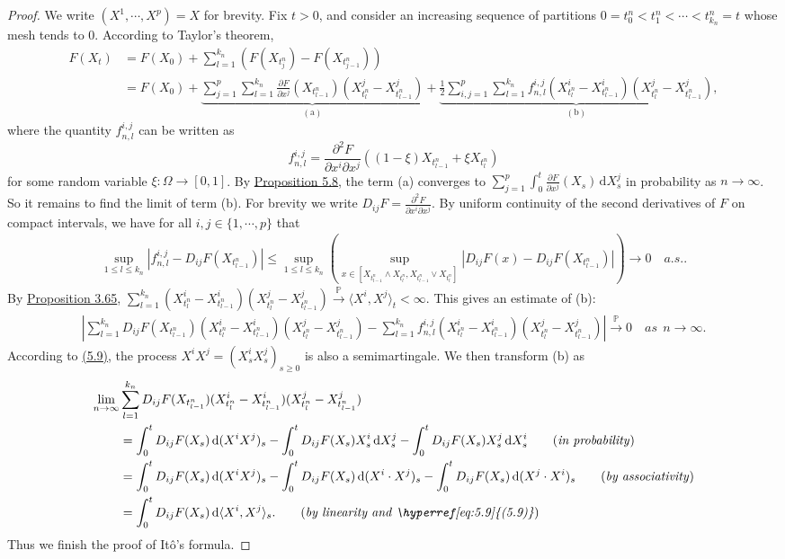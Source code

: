 \documentclass{article}
\numberwithin{equation}{section}
\renewcommand{\P}{\mathbb{P}}
\renewcommand{\d}{\mathrm{d}}
\theoremstyle{plain}
\theoremstyle{definition}
\begin{document}
\begin{proof}
We write $(X^1,\cdots,X^p)=X$ for brevity. Fix $t>0$, and consider an increasing sequence of partitions $0=t_0^n<t_1^n<\cdots<t_{k_n}^n=t$ whose mesh tends to $0$. According to Taylor's theorem,
\begin{align*}
	F(X_t)&=F(X_0)+\sum_{l=1}^{k_n}\left(F(X_{t_j^n})-F(X_{t_{j-1}^n})\right)\\
	&=F(X_0)+\underbrace{\sum_{j=1}^p\sum_{l=1}^{k_n}\frac{\partial F}{\partial x^j}(X_{t_{l-1}^n})(X_{t_l^n}^j-X_{t_{l-1}^n}^j)}_{\mathrm{(a)}} + \underbrace{\frac{1}{2}\sum_{i,j=1}^p\sum_{l=1}^{k_n} f_{n,l}^{i,j}(X_{t_l^n}^i-X_{t_{l-1}^n}^i)(X_{t_l^n}^j-X_{t_{l-1}^n}^j)}_{\mathrm{(b)}},
\end{align*}
where the quantity $f_{n,l}^{i,j}$ can be written as 
$$f_{n,l}^{i,j} = \frac{\partial^2 F}{\partial x^i\partial x^j}((1-\xi)X_{t_{l-1}^n}+\xi X_{t_l^n})$$
for some random variable $\xi:\Omega\to[0,1]$. By \hyperref[prop:5.8]{Proposition 5.8}, the term (a) converges to $\sum_{j=1}^p\int_0^t\frac{\partial F}{\partial x^j}(X_s)\,\d X_s^j$ in probability as $n\to\infty$. So it remains to find the limit of term (b). For brevity we write $D_{ij}F=\frac{\partial^2 F}{\partial x^i\partial x^j}$. By uniform continuity of the second derivatives of $F$ on compact intervals, we have for all $i,j\in\{1,\cdots,p\}$ that
\begin{align*}
	\sup_{1\leq l\leq k_n}\left\vert f_{n,l}^{i,j}-D_{ij}F(X_{t_{l-1}^n})\right\vert\leq\sup_{1\leq l\leq k_n}\left(\sup_{x\in\left[X_{t_{l-1}^n}\wedge X_{t_l^n},X_{t_{l-1}^n}\vee X_{t_l^n}\right]} \left\vert D_{ij}F(x)-D_{ij}F(X_{t_{l-1}^n})\right\vert\right)\to 0\quad a.s..
\end{align*}
By \hyperref[prop:3.65]{Proposition 3.65}, $\sum_{l=1}^{k_n}(X_{t_l^n}^i-X_{t_{l-1}^n}^i)(X_{t_l^n}^j-X_{t_{l-1}^n}^j)\overset{\P}{\to}\langle X^i,X^j\rangle_t < \infty$. This gives an estimate of (b):
\begin{align*}
	\left\vert\sum_{l=1}^{k_n} D_{ij}F(X_{t_{l-1}^n})(X_{t_l^n}^i-X_{t_{l-1}^n}^i)(X_{t_l^n}^j-X_{t_{l-1}^n}^j)-\sum_{l=1}^{k_n} f_{n,l}^{i,j}(X_{t_l^n}^i-X_{t_{l-1}^n}^i)(X_{t_l^n}^j-X_{t_{l-1}^n}^j)\right\vert\overset{\P}{\to} 0\quad \textit{as}\ \ n\to\infty.
\end{align*}
According to \hyperref[eq:5.9]{(5.9)}, the process $X^iX^j=(X_s^iX_s^j)_{s\geq 0}$ is also a semimartingale. We then transform (b) as
\begin{align*}
	\lim_{n\to\infty}&\sum_{l=1}^{k_n} D_{ij}F(X_{t_{l-1}^n})(X_{t_l^n}^i-X_{t_{l-1}^n}^i)(X_{t_l^n}^j-X_{t_{l-1}^n}^j)\\
	&= \int_0^t D_{ij}F(X_s)\,\d (X^iX^j)_s - \int_0^t D_{ij}F(X_s)X^i_s\,\d X^j_s - \int_0^t D_{ij}F(X_s)X^j_s\,\d X^i_s \tag{\textit{in probability}}\\
	&=\int_0^t D_{ij}F(X_s)\,\d (X^iX^j)_s - \int_0^t D_{ij}F(X_s)\,\d (X^i\cdot X^j)_s - \int_0^t D_{ij}F(X_s)\,\d (X^j\cdot X^i)_s \tag{\textit{by associativity}}\\
	&= \int_0^t D_{ij}F(X_s)\,\d \langle X^i,X^j\rangle_s. \tag{\textit{by linearity and \hyperref[eq:5.9]{(5.9)}}}
\end{align*}
Thus we finish the proof of Itô's formula.
\end{proof}
\end{document}
